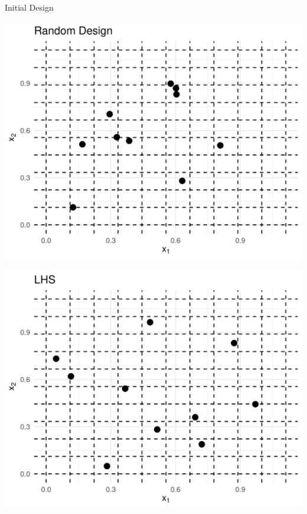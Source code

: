 \documentclass[11pt,compress,t,notes=noshow, xcolor=table]{beamer}
\begin{document}
\begin{frame}{Initial Design}

\vspace{1em}

\begin{minipage}[b]{0.45\textwidth}
  \includegraphics[width = \textwidth]{slides/010-bayesian-optimization/figure_man/init_0.png}
\end{minipage}
\hfill
\begin{minipage}[b]{0.45\textwidth}
  \includegraphics[width = \textwidth]{slides/010-bayesian-optimization/figure_man/init_1.png}
\end{minipage}

\end{frame}
\end{document}
